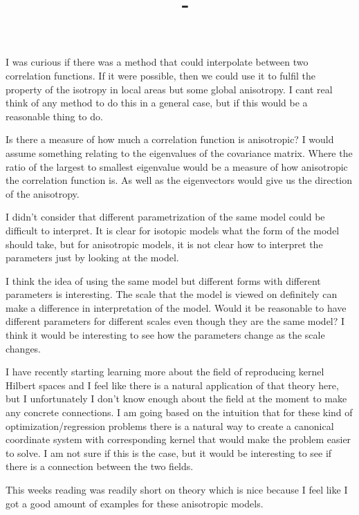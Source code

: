 \documentclass[answers,12pt,addpoints]{exam}
\author{\name}
\title{\course \ - \assignment}
\begin{document}
\maketitle
\begin{questions}
\question I was curious if there was a method that could interpolate between two correlation functions. If it were possible, then we could use it to fulfil the property of the isotropy in local areas but some global anisotropy. I cant real think of any method to do this in a general case, but if this would be a reasonable thing to do.

\question Is there a measure of how much a correlation function is anisotropic? I would assume something relating to the eigenvalues of the covariance matrix. Where the ratio of the largest to smallest eigenvalue would be a measure of how anisotropic the correlation function is. As well as the eigenvectors would give us the direction of the anisotropy. 

\question I didn't consider that different parametrization of the same model could be difficult to interpret. It is clear for isotopic models what the form of the model should take, but for anisotropic models, it is not clear how to interpret the parameters just by looking at the model. 

\question I think the idea of using the same model but different forms with different parameters is interesting. The scale that the model is viewed on definitely can make a difference in interpretation of the model. Would it be reasonable to have different parameters for different scales even though they are the same model? I think it would be interesting to see how the parameters change as the scale changes.

\question I have recently starting learning more about the field of reproducing kernel Hilbert spaces and I feel like there is a natural application of that theory here, but I unfortunately I don't know enough about the field at the moment to make any concrete connections. I am going based on the intuition that for these kind of optimization/regression problems there is a natural way to create a canonical coordinate system with corresponding kernel that would make the problem easier to solve. I am not sure if this is the case, but it would be interesting to see if there is a connection between the two fields.

\question This weeks reading was readily short on theory which is nice because I feel like I got a good amount of examples for these anisotropic models. 
\end{questions}
\end{document}
